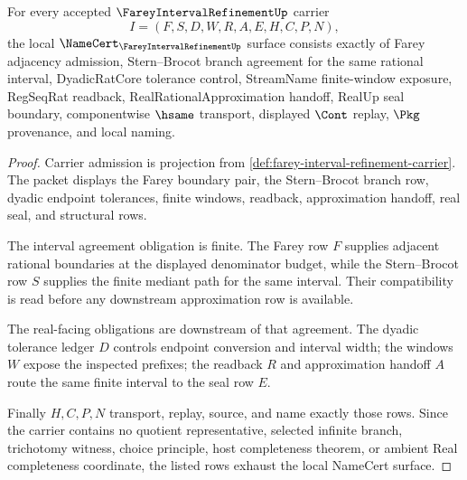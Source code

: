 \begin{theorem}
\label{thm:farey-interval-refinement-namecert-obligations}
For every accepted $\FareyIntervalRefinementUp$ carrier
$$
I=(F,S,D,W,R,A,E,H,C,P,N),
$$
the local $\NameCert_{\FareyIntervalRefinementUp}$ surface consists exactly of Farey adjacency admission, Stern--Brocot branch agreement for the same rational interval, DyadicRatCore tolerance control, StreamName finite-window exposure, RegSeqRat readback, RealRationalApproximation handoff, RealUp seal boundary, componentwise $\hsame$ transport, displayed $\Cont$ replay, $\Pkg$ provenance, and local naming.
\end{theorem}
\begin{proof}
Carrier admission is projection from \autoref{def:farey-interval-refinement-carrier}. The packet displays the Farey boundary pair, the Stern--Brocot branch row, dyadic endpoint tolerances, finite windows, readback, approximation handoff, real seal, and structural rows.

The interval agreement obligation is finite. The Farey row $F$ supplies adjacent rational boundaries at the displayed denominator budget, while the Stern--Brocot row $S$ supplies the finite mediant path for the same interval. Their compatibility is read before any downstream approximation row is available.

The real-facing obligations are downstream of that agreement. The dyadic tolerance ledger $D$ controls endpoint conversion and interval width; the windows $W$ expose the inspected prefixes; the readback $R$ and approximation handoff $A$ route the same finite interval to the seal row $E$.

Finally $H,C,P,N$ transport, replay, source, and name exactly those rows. Since the carrier contains no quotient representative, selected infinite branch, trichotomy witness, choice principle, host completeness theorem, or ambient Real completeness coordinate, the listed rows exhaust the local NameCert surface.
\end{proof}

